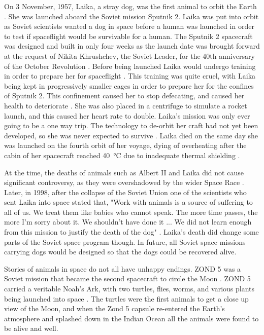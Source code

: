 \documentclass[10pt, journal]{IEEEtran}
\begin{document}
On 3 November, 1957, Laika, a stray dog, was the first animal to orbit the Earth \cite{laika}. She was launched aboard the Soviet mission Sputnik 2. Laika was put into orbit as Soviet scientists wanted a dog in space before a human was launched in order to test if spaceflight would be survivable for a human. The Sputnik 2 spacecraft was designed and built in only four weeks \cite{doges} as the launch date was brought forward at the request of Nikita Khrushchev, the Soviet Leader, for the 40th anniversary of the October Revolution \cite{moveDoge}. Before being launched Laika would undergo training in order to prepare her for spaceflight \cite{laikaTraining}. This training was quite cruel, with Laika being kept in progressively smaller cages in order to prepare her for the confines of Sputnik 2. This confinement caused her to stop defecating, and caused her health to deteriorate \cite{laikaTraining}. She was also placed in a centrifuge to simulate a rocket launch, and this caused her heart rate to double\cite{laikaTraining}. Laika's mission was only ever going to be a one way trip. The technology to de-orbit her craft had not yet been developed, so she was never expected to survive \cite{apLaika}. Laika died on the same day she was launched on the fourth orbit of her voyage, dying of overheating after the cabin of her spacecraft reached \SI{40}{\celsius} due to inadequate thermal shielding \cite{apLaika}.

At the time, the deaths of animals such as Albert II and Laika did not cause significant controversy, as they were overshadowed by the wider Space Race \cite{sadForDoge}. Later, in 1998, after the collapse of the Soviet Union one of the scientists who sent Laika into space stated that, "Work with animals is a source of suffering to all of us. We treat them like babies who cannot speak. The more time passes, the more I'm sorry about it. We shouldn't have done it ... We did not learn enough from this mission to justify the death of the dog" \cite{sadForDoge}. Laika's death did change some parts of the Soviet space program though. In future, all Soviet space missions carrying dogs would be designed so that the dogs could be recovered alive. 

Stories of animals in space do not all have unhappy endings. ZOND 5 was a Soviet mission that became the second spacecraft to circle the Moon \cite{zond}. ZOND 5 carried a veritable Noah's Ark, with two turtles, flies, worms, and various plants being launched into space \cite{zond}. The turtles were the first animals to get a close up view of the Moon, and when the Zond 5 capsule re-entered the Earth's atmosphere and splashed down in the Indian Ocean all the animals were found to be alive and well.
\end{document}
